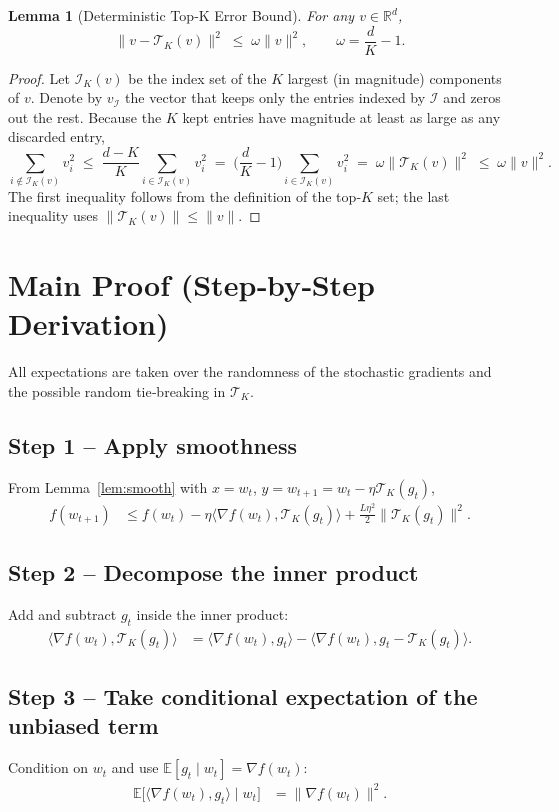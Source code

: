 \documentclass{article}
\newtheorem{lemma}{Lemma}
\newcommand{\TopK}{\mathcal{T}_K}
\newcommand{\E}{\mathbb{E}}
\newcommand{\R}{\mathbb{R}}
\begin{document}
\begin{lemma}[Deterministic Top‑K Error Bound]\label{lem:deterministic}
For any $v\in\R^{d}$,
\[
\|v-\TopK(v)\|^{2}\;\le\;\omega\|v\|^{2},
\qquad\omega=\frac{d}{K}-1.
\]
\end{lemma}
\begin{proof}
Let $\mathcal{I}_K(v)$ be the index set of the $K$ largest (in magnitude) components of $v$.
Denote by $v_{\mathcal{I}}$ the vector that keeps only the entries indexed by $\mathcal{I}$ and zeros out the rest.
Because the $K$ kept entries have magnitude at least as large as any discarded entry,
\[
\sum_{i\notin\mathcal{I}_K(v)} v_i^{2}
\;\le\;
\frac{d-K}{K}\sum_{i\in\mathcal{I}_K(v)} v_i^{2}
\;=\;
\Big(\frac{d}{K}-1\Big)\sum_{i\in\mathcal{I}_K(v)} v_i^{2}
\;=\;
\omega\| \TopK(v)\|^{2}
\;\le\;
\omega\|v\|^{2}.
\]
The first inequality follows from the definition of the top‑$K$ set; the last inequality uses $\|\TopK(v)\|\le\|v\|$.
\end{proof}

\section*{Main Proof (Step‑by‑Step Derivation)}
All expectations are taken over the randomness of the stochastic gradients and the possible random tie‑breaking in $\TopK$.

\subsection*{Step 1 – Apply smoothness}
From Lemma~\ref{lem:smooth} with $x=w_t$, $y=w_{t+1}=w_t-\eta\TopK(g_t)$,
\begin{align}
f(w_{t+1})
&\le f(w_t)-\eta\langle\nabla f(w_t),\TopK(g_t)\rangle
      +\frac{L\eta^{2}}{2}\|\TopK(g_t)\|^{2}.
\tag{Step 1}
\end{align}

\subsection*{Step 2 – Decompose the inner product}
Add and subtract $g_t$ inside the inner product:
\begin{align}
\langle\nabla f(w_t),\TopK(g_t)\rangle
&=\langle\nabla f(w_t),g_t\rangle
  -\langle\nabla f(w_t),g_t-\TopK(g_t)\rangle.
\tag{Step 2}
\end{align}

\subsection*{Step 3 – Take conditional expectation of the unbiased term}
Condition on $w_t$ and use $\E[g_t\mid w_t]=\nabla f(w_t)$:
\begin{align}
\E\!\big[\langle\nabla f(w_t),g_t\rangle\mid w_t\big]
&=\|\nabla f(w_t)\|^{2}.
\tag{Step 3}
\end{align}
\end{document}
